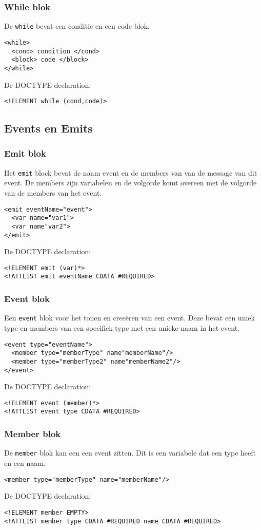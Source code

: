 \documentclass[]{article}
\begin{document}
\subsubsection{While blok}
De \texttt{while} bevat een conditie en een code blok.
\lstset{language=XML}
\begin{lstlisting}
<while>
  <cond> condition </cond>
  <block> code </block>
</while>
\end{lstlisting}
De DOCTYPE declaration: 
\lstset{language=XML}
\begin{lstlisting}
<!ELEMENT while (cond,code)>
\end{lstlisting}

\subsection{Events en Emits}
\subsubsection{Emit blok}
Het \texttt{emit} block bevat de naam event en de members van van de message van dit event.
De members zijn variabelen en de volgorde komt overeen met de volgorde van de members van het event.
\lstset{language=XML}
\begin{lstlisting}
<emit eventName="event">
  <var name="var1">
  <var name"var2">
</emit>
\end{lstlisting}
De DOCTYPE declaration: 
\lstset{language=XML}
\begin{lstlisting}
<!ELEMENT emit (var)*>
<!ATTLIST emit eventName CDATA #REQUIRED>
\end{lstlisting}
\subsubsection{Event blok}
Een \texttt{event} blok voor het tonen en cree\"{e}ren van een event. Deze bevat een uniek type en members van een specifiek type met een unieke naam in het event.
\lstset{language=XML}
\begin{lstlisting}
<event type="eventName">
  <member type="memberType" name"memberName"/>
  <member type="memberType2" name"memberName2"/>
</event>
\end{lstlisting}
De DOCTYPE declaration: 
\lstset{language=XML}
\begin{lstlisting}
<!ELEMENT event (member)*>
<!ATTLIST event type CDATA #REQUIRED>
\end{lstlisting}
\subsubsection{Member blok}
De \texttt{member} blok kan een een event zitten. Dit is een variabele dat een type heeft en een naam.
\lstset{language=XML}
\begin{lstlisting}
<member type="memberType" name="memberName"/>
\end{lstlisting}
De DOCTYPE declaration: 
\lstset{language=XML}
\begin{lstlisting}
<!ELEMENT member EMPTY>
<!ATTLIST member type CDATA #REQUIRED name CDATA #REQUIRED>
\end{lstlisting}
\end{document}
